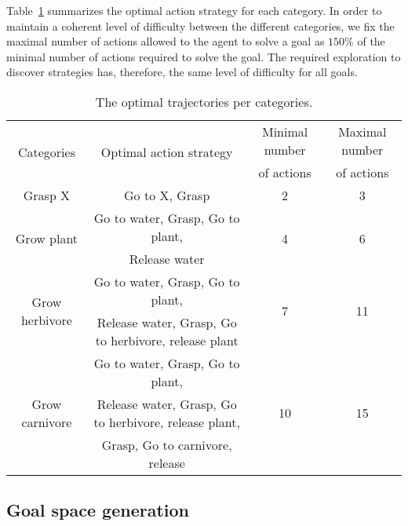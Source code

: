 Table~\ref{tab:optimal_trajectories_categories} summarizes the optimal action strategy for each category. In order to maintain a coherent level of difficulty between the different categories, we fix the maximal number of actions allowed to the agent to solve a goal as $150\%$ of the minimal number of actions required to solve the goal. The required exploration to discover strategies has, therefore, the same level of difficulty for all goals. 
\begin{table}[!ht]
\caption{The optimal trajectories per categories.}
\label{tab:optimal_trajectories_categories}
\begin{tabular}{|c|c|c|c|}
\hline
\multirow{2}{*}{Categories}           & \multirow{2}{*}{Optimal action strategy}              & Minimal number & Maximal number \\
                     &                                          & of actions     & of actions     \\ \hline
Grasp X              & Go to X, Grasp                           & 2              & 3              \\ \hline
\multirow{2}{*}{Grow plant} & Go to water, Grasp, Go to plant, & \multirow{2}{*}{4}              & \multirow{2}{*}{6}              \\
                     & Release water &              &             \\ \hline
\multirow{2}{*}{Grow herbivore} & Go to water, Grasp, Go to plant, & \multirow{2}{*}{7}              & \multirow{2}{*}{11}              \\
                     & Release water, Grasp, Go to herbivore, release plant &              &             \\ \hline
\multirow{3}{*}{Grow carnivore} & Go to water, Grasp, Go to plant, & \multirow{3}{*}{10}              & \multirow{3}{*}{15}              \\
                     & Release water, Grasp, Go to herbivore, release plant, &              &             \\
                     & Grasp, Go to carnivore, release &              &             \\ \hline

\end{tabular}
\end{table}

\subsection{Goal space generation}
\label{app:goal_space_generation}

